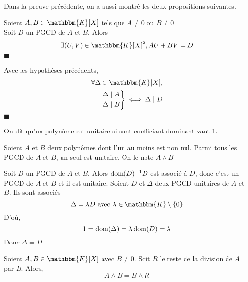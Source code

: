 \begin{rmk}
	Dans la preuve précédente, on a aussi montré les deux propositions suivantes.
\end{rmk}

\begin{thm}
	Soient $A,B \in \mathbbm{K}[X]$ tels que $A \neq 0$ ou $B \neq 0$ \\
	Soit $D$ un PGCD de $A$ et $B$. Alors \[
		\exists (U,V)\in \mathbbm{K}[X]^2, AU + BV = D
	\]
	\hfill $\blacksquare$
\end{thm}

\begin{prop}
	Avec les hypothèses précédents,
	\begin{align*}
		\forall \Delta \in \mathbbm{K}[X],\\
		\begin{rcases*}
			\Delta  \mid  A\\
			\Delta  \mid B
		\end{rcases*} \iff \Delta \mid D
	\end{align*}
	\hfill $\blacksquare$
\end{prop}

\begin{defn}
	On dit qu'un polynôme est \underline{unitaire} si sont coefficiant dominant vaut 1.
\end{defn}

\begin{prop-defn}
	Soient $A$ et $B$ deux polynômes dont l'un au moins est non nul. Parmi tous les PGCD de $A$ et $B$, un seul est unitaire. On le note $A \wedge B$
\end{prop-defn}

\begin{prv}
	Soit $D$ un PGCD de $A$ et $B$. Alors $\operatorname*{dom}(D)^{-1}D$ est associé à $D$, donc c'est un PGCD de $A$ et $B$ et il est unitaire. Soient $D$ et $\Delta$ deux PGCD unitaires de $A$ et $B$. Ils sont associés \[
		\Delta = \lambda D \text{ avec } \lambda \in \mathbbm{K}\setminus \{0\}
	\] D'où, \[
		1 = \operatorname*{dom}(\Delta) = \lambda \operatorname*{dom}(D) = \lambda
	\] Donc $\Delta = D$
\end{prv}

\begin{prop}
	Soient $A,B \in \mathbbm{K}[X]$ avec $B \neq 0$. Soit $R$ le reste de la division de $A$ par $B$. Alors, \[
		A \wedge B = B \wedge R
	\] 
\end{prop}

\begin{prv}
\end{prv}

